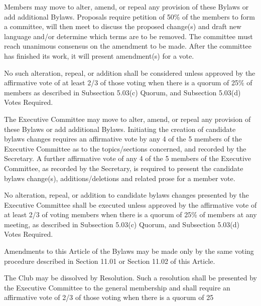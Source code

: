 \documentclass{bylaws}
\begin{document}
Members may move to alter, amend, or repeal any provision of these Bylaws or add additional Bylaws. Proposals require petition of 50\% of the members to form a committee, will then meet to discuss the proposed change(s) and draft new language and/or determine which terms are to be removed. The committee must reach unanimous consensus on the amendment to be made. After the committee has finished its work, it will present amendment(s) for a vote.

No such alteration, repeal, or addition shall be considered unless approved by the affirmative vote of at least 2/3 of those voting when there is a quorum of 25\% of members as described in Subsection 5.03(c) Quorum, and Subsection 5.03(d) Votes Required.

The Executive Committee may move to alter, amend, or repeal any provision of these Bylaws or add additional Bylaws. Initiating the creation of candidate bylaws changes requires an affirmative vote by any 4 of the 5 members of the Executive Committee as to the topics/sections concerned, and recorded by the Secretary. A further affirmative vote of any 4 of the 5 members of the Executive Committee, as recorded by the Secretary, is required to present the candidate bylaws change(s), additions/deletions and related prose for a member vote.

No alteration, repeal, or addition to candidate bylaws changes presented by the Executive Committee shall be executed unless approved by the affirmative vote of at least 2/3 of voting members when there is a quorum of 25\% of members at any meeting, as described in Subsection 5.03(c) Quorum, and Subsection 5.03(d) Votes Required.

Amendments to this Article of the Bylaws may be made only by the same voting procedure described in Section 11.01 or Section 11.02 of this Article. 



The Club may be dissolved by Resolution. Such a resolution shall be presented by the Executive Committee to the general membership and shall require an affirmative vote of 2/3 of those voting when there is a quorum of 25%
\end{document}
